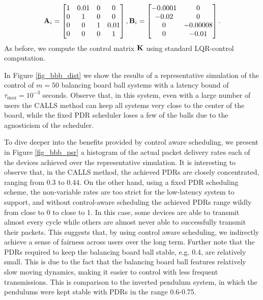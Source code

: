 \begin{align}\label{eq_control_orig}
\bbA_i =
\begin{bmatrix}
1 & 0.01 & 0 & 0 \\
0 & 1 & 0 & 0 \\
0 & 0 & 1 & 0.01 \\
0 & 0 & 0 & 1
\end{bmatrix},
\bbB_i =
\begin{bmatrix}
-0.0001 & 0\\ -0.02  & 0\\ 0 &-0.00008 \\ 0 & -0.01
\end{bmatrix}.
\end{align}
%
As before, we compute the control matrix ${\mathbf K}$ using standard LQR-control computation.

In Figure \ref{fig_bbb_dist} we show the results of a representative simulation of the control of $m=50$ balancing board ball systems with a latency bound of $\tau_{\max} = 10^{-3}$ seconds. Observe that, in this system, even with a large number of users the CALLS method can keep all systems very close to the center of the board, while the fixed PDR scheduler loses a few of the balls due to the agnosticism of the scheduler.

 To dive deeper into the benefits provided by control aware scheduling, we present in Figure \ref{fig_bbb_psr} a histogram of the actual  packet delivery rates each of the devices achieved over the representative simulation. It is interesting to observe that, in the CALLS method, the achieved PDRs are closely concentrated, ranging from 0.3 to 0.44. On the other hand, using a fixed PDR scheduling scheme, the non-variable rates are too strict for the low-latency system to support, and without control-aware scheduling the achieved PDRs range wildly from close to 0 to close to 1. In this case, some devices are able to transmit almost every cycle while others are almost never able to successfully transmit their packets. This suggests that, by using control aware scheduling, we indirectly achieve a sense of fairness across users over the long term. Further note that the PDRs required to keep the balancing board ball stable, e.g. 0.4, are relatively small. This is due to the fact that the balancing board ball features relatively slow moving dynamics, making it easier to control with less frequent transmissions. This is comparison to the inverted pendulum system, in which the pendulums were kept stable with PDRs in the range 0.6-0.75.


